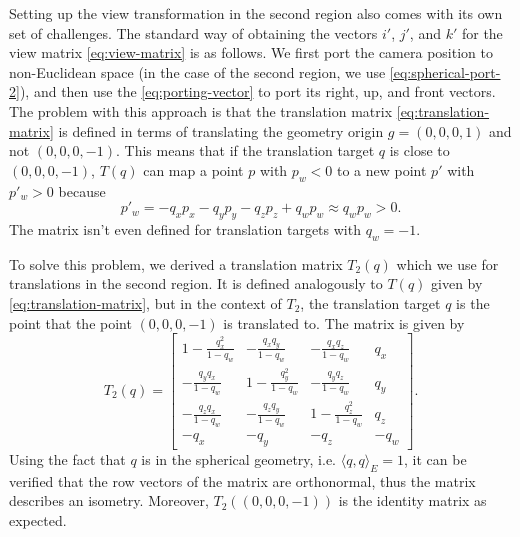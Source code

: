 Setting up the view transformation in the second region also comes with its own set of challenges.
The standard way of obtaining the vectors $i'$, $j'$, and $k'$ for the view matrix \ref{eq:view-matrix} is as follows.
We first port the camera position to non-Euclidean space (in the case of the second region, we use \autoref{eq:spherical-port-2}), and then use the \autoref{eq:porting-vector} to port its right, up, and front vectors.
The problem with this approach is that the translation matrix \ref{eq:translation-matrix} is defined in terms of translating the geometry origin $g = (0, 0, 0, 1)$ and not $(0, 0, 0, -1)$.
This means that if the translation target $q$ is close to $(0, 0, 0, -1)$, $T(q)$ can map a point $p$ with $p_w < 0$ to a new point $p'$ with $p'_w > 0$ because
\begin{equation*}
    p'_w = -q_x p_x - q_y p_y - q_z p_z + q_w p_w \approx q_w p_w > 0.
\end{equation*}
The matrix isn't even defined for translation targets with $q_w = -1$.

To solve this problem, we derived a translation matrix $T_2(q)$ which we use for translations in the second region.
It is defined analogously to $T(q)$ given by \autoref{eq:translation-matrix}, but in the context of $T_2$, the translation target $q$ is the point that the point $(0, 0, 0, -1)$ is translated to.
The matrix is given by
\begin{equation}
    T_2(q) = \begin{bmatrix}
        1 - \frac{q_x^2}{1 - q_w} & -\frac{q_x q_y}{1 - q_w}  & -\frac{q_x q_z}{1 - q_w}  & q_x  \\
        -\frac{q_y q_x}{1 - q_w}  & 1 - \frac{q_y^2}{1 - q_w} & -\frac{q_y q_z}{1 - q_w}  & q_y  \\
        -\frac{q_z q_x}{1 - q_w}  & -\frac{q_z q_y}{1 - q_w}  & 1 - \frac{q_z^2}{1 - q_w} & q_z  \\
        -q_x                      & -q_y                      & -q_z                      & -q_w
    \end{bmatrix}.
\end{equation}
Using the fact that $q$ is in the spherical geometry, i.e. $\langle q, q \rangle_E = 1$, it can be verified that the row vectors of the matrix are orthonormal, thus the matrix describes an isometry.
Moreover, $T_2((0, 0, 0, -1))$ is the identity matrix as expected.